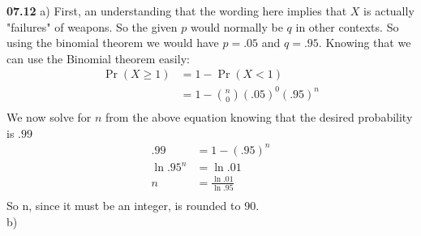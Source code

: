 {\bf 07.12} \quad a) First, an understanding that the wording here implies that $X$ is actually "failures" of weapons. So the given $p$ would normally be $q$ in other contexts. So using the binomial theorem we would have $p = .05$ and $q = .95$. Knowing that we can use the Binomial theorem easily:
\begin{align*}
	\Pr \left( X \geq 1 \right) & = 1 - \Pr \left( X < 1 \right ) \\
	& = 1 - {n \choose 0} (.05)^0 (.95)^{n} \\
\end{align*}
We now solve for $n$ from the above equation knowing that the desired probability is $.99$ \\
\begin{align*}
	.99 & = 1 - (.95)^{n} \\
	\ln .95^{n} & = \ln .01 \\
	n & = \frac{\ln .01}{\ln .95} \\
\end{align*}
So n, since it must be an integer, is rounded to 90.
\\
b) \\
